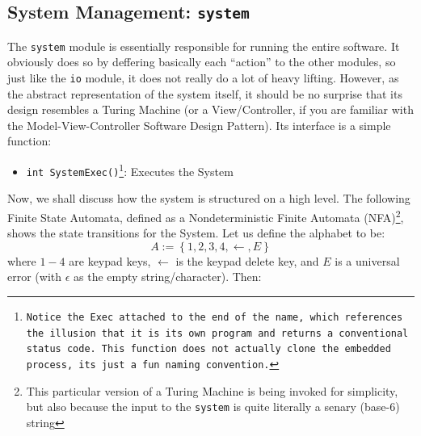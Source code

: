 \documentclass[letterpaper]{article}
\begin{document}
\newpage

\subsection{System Management: \texttt{system}}
The \texttt{system} module is essentially responsible for running the entire software. It obviously does so by deffering basically each ``action'' to the other modules, so just like the \texttt{io} module, it does not really do a lot of heavy lifting. However, as the abstract representation of the system itself, it should be no surprise that its design resembles a Turing Machine (or a View/Controller, if you are familiar with the Model-View-Controller Software Design Pattern). Its interface is a simple function:
\begin{itemize}
    \item \texttt{int SystemExec()\footnote{Notice the \texttt{Exec} attached to the end of the name, which references the illusion that it is its own program and returns a conventional status code. This function does not actually clone the embedded process, its just a fun naming convention.}}: Executes the System
\end{itemize}
Now, we shall discuss how the system is structured on a high level. The following Finite State Automata, defined as a Nondeterministic Finite Automata (NFA)\footnote{This particular version of a Turing Machine is being invoked for simplicity, but also because the input to the \texttt{system} is quite literally a senary (base-6) string}, shows the state transitions for the System. Let us define the alphabet to be:
$$\boxed{A := \left\{1, 2, 3, 4, \leftarrow, E\right\}}$$
where $1-4$ are keypad keys, $\leftarrow$ is the keypad delete key, and $E$ is a universal error (with $\epsilon$ as the empty string/character). Then:
\end{document}
